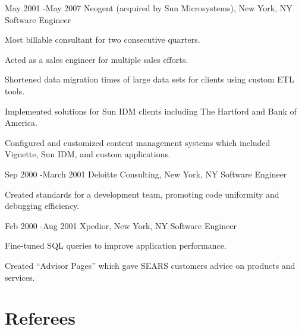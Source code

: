 \documentclass[10pt]{article} %
\begin{document}

\job
{May 2001 -}{May 2007}
{Neogent (acquired by Sun Microsystems), New York, NY}
{}
{Software Engineer}
{
\begin{itemize-noindent}
\item{Most billable consultant for two consecutive quarters.} 
\item{Acted as a sales engineer for multiple sales efforts.} 
\item{Shortened data migration times of large data sets for clients using custom ETL tools.} 
\item{Implemented solutions for Sun IDM clients including The Hartford and Bank of America.} 
\item{Configured and customized content management systems which included Vignette, Sun IDM, and custom applications.} 
\end{itemize-noindent}
}



\job
{Sep 2000 -}{March 2001}
{Deloitte Consulting, New York, NY}
{}
{Software Engineer}
{
\begin{itemize-noindent}
\item{Created standards for a development team, promoting code uniformity and debugging efficiency.}
\end{itemize-noindent}
}


\job
{Feb 2000 -}{Aug 2001}
{Xpedior, New York, NY}
{}
{Software Engineer}
{
\begin{itemize-noindent}
\item{Fine-tuned SQL queries to improve application performance.}
\item{Created “Advisor Pages” which gave SEARS customers advice on products and services.}
\end{itemize-noindent}
}






\section{Referees}
\end{document}
